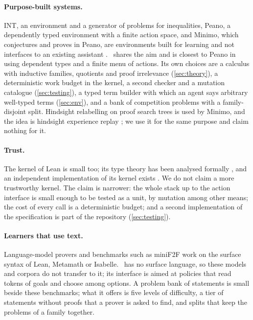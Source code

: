 \paragraph{Purpose-built systems.}
INT, an environment and a generator of problems for inequalities, Peano, a dependently typed environment with a finite action space, and Minimo, which conjectures and proves in Peano, are environments built for learning and not interfaces to an existing assistant \citep{wu21,poesia23,poesia24}.
\ITP\ shares the aim and is closest to Peano in using dependent types and a finite menu of actions.
Its own choices are a calculus with inductive families, quotients and proof irrelevance (\cref{sec:theory}), a deterministic work budget in the kernel, a second checker and a mutation catalogue (\cref{sec:testing}), a typed term builder with which an agent says arbitrary well-typed terms (\cref{sec:env}), and a bank of competition problems with a family-disjoint split.
Hindsight relabelling on proof search trees is used by Minimo, and the idea is hindsight experience replay \citep{andrychowicz17}; we use it for the same purpose and claim nothing for it.

\paragraph{Trust.}
The kernel of Lean is small too; its type theory has been analysed formally \citep{carneiro19}, and an independent implementation of its kernel exists \citep{carneiro24}.
We do not claim a more trustworthy kernel.
The claim is narrower: the whole stack up to the action interface is small enough to be tested as a unit, by mutation among other means; the cost of every call is a deterministic budget; and a second implementation of the specification is part of the repository (\cref{sec:testing}).

\paragraph{Learners that use text.}
Language-model provers \citep{polu20,han22,polu23,lample22,jiang23,xin24,xin25,ren25,lin25,hubert25} and benchmarks such as miniF2F \citep{zheng22} work on the surface syntax of Lean, Metamath or Isabelle.
\ITP\ has no surface language, so these models and corpora do not transfer to it; its interface is aimed at policies that read tokens of goals and choose among options.
A problem bank of \bankProblems{} statements is small beside these benchmarks; what it offers is five levels of difficulty, a tier of statements without proofs that a prover is asked to find, and splits that keep the problems of a family together.
